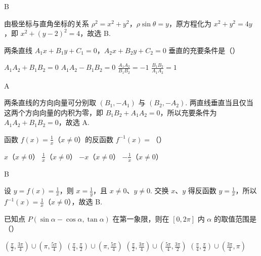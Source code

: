 \begin{answer}
B
\end{answer}

\begin{solution}
由极坐标与直角坐标的关系 \(\rho^{2}=x^{2}+y^{2}\)，\(\rho\sin\theta=y\)，原方程化为
\(x^{2}+y^{2}=4y\)，即 \(x^{2}+(y-2)^{2}=4\)，故选 B.
\end{solution}

\begin{problem}
两条直线 \(A_{1}x + B_{1}y + C_{1} = 0\)，\(A_{2}x + B_{2}y + C_{2} = 0\) 垂直的充要条件是（\quad）

\choices
    {\(A_{1}A_{2} + B_{1}B_{2} = 0\)}
    {\(A_{1}A_{2} - B_{1}B_{2} = 0\)}
    {\(\frac{A_1A_2}{B_1B_2} = -1\)}
    {\(\frac{B_1B_2}{A_1A_2} = 1\)}
\end{problem}

\begin{answer}
A
\end{answer}

\begin{solution}
两条直线的方向向量可分别取 \((B_{1},-A_{1})\) 与 \((B_{2},-A_{2})\). 两直线垂直当且仅当这两个方向向量的内积为零，即
\(B_{1}B_{2}+A_{1}A_{2}=0\)，所以充要条件为 \(A_{1}A_{2}+B_{1}B_{2}=0\)，故选 A.
\end{solution}

\begin{problem}
函数 \(f(x)=\frac{1}{x}\)（\(x\neq 0\)）的反函数 \(f^{-1}(x)=\)（\quad）

\choices
    {\(x\)（\(x\neq 0\)）}
    {\(\frac{1}{x}\)（\(x\neq 0\)）}
    {\(-x\)（\(x\neq 0\)）}
    {\(-\frac{1}{x}\)（\(x\neq 0\)）}
\end{problem}

\begin{answer}
B
\end{answer}

\begin{solution}
设 \(y=f(x)=\frac{1}{x}\)，则 \(x=\frac{1}{y}\)，且 \(x\neq0\)、\(y\neq0\). 交换 \(x\)、\(y\) 得反函数 \(y=\frac{1}{x}\)，所以 \(f^{-1}(x)=\frac{1}{x}\)（\(x\neq0\)），故选 B.
\end{solution}

\begin{problem}
已知点 \(P(\sin \alpha - \cos \alpha, \tan \alpha)\) 在第一象限，则在 \([0, 2\pi]\) 内 \(\alpha\) 的取值范围是（\quad）

\choices
    {\(\left(\frac{\pi}{2}, \frac{3\pi}{4}\right) \cup \left(\pi, \frac{5\pi}{4}\right)\)}
    {\(\left(\frac{\pi}{4}, \frac{\pi}{2}\right) \cup \left(\pi, \frac{5\pi}{4}\right)\)}
    {\(\left(\frac{\pi}{2}, \frac{3\pi}{4}\right) \cup \left(\frac{5\pi}{4}, \frac{3\pi}{2}\right)\)}
    {\(\left(\frac{\pi}{4}, \frac{\pi}{2}\right) \cup \left(\frac{3\pi}{4}, \pi\right)\)}
\end{problem}

